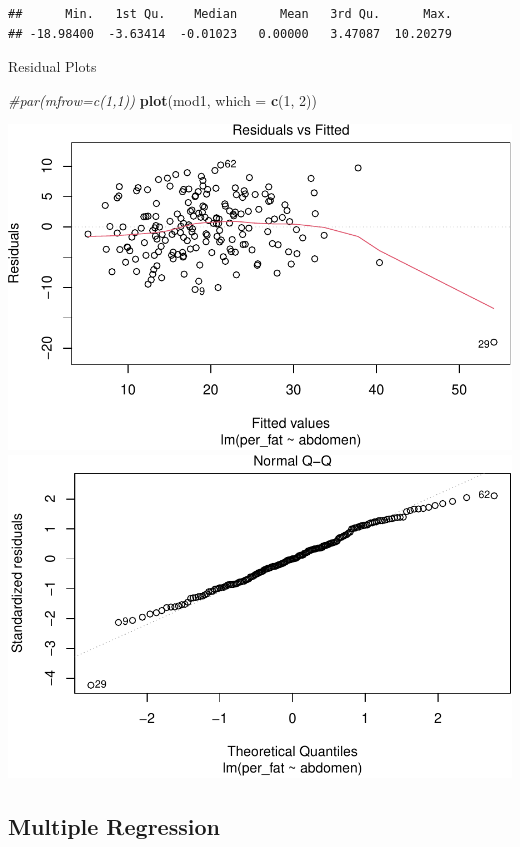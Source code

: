 \documentclass[]{article}
\newenvironment{Shaded}{\begin{snugshade}}{\end{snugshade}}
\newcommand{\KeywordTok}[1]{\textcolor[rgb]{0.13,0.29,0.53}{\textbf{#1}}}
\newcommand{\DataTypeTok}[1]{\textcolor[rgb]{0.13,0.29,0.53}{#1}}
\newcommand{\DecValTok}[1]{\textcolor[rgb]{0.00,0.00,0.81}{#1}}
\newcommand{\CommentTok}[1]{\textcolor[rgb]{0.56,0.35,0.01}{\textit{#1}}}
\newcommand{\NormalTok}[1]{#1}
\begin{document}
\begin{verbatim}
##      Min.   1st Qu.    Median      Mean   3rd Qu.      Max. 
## -18.98400  -3.63414  -0.01023   0.00000   3.47087  10.20279
\end{verbatim}

Residual Plots

\begin{Shaded}
\begin{Highlighting}[]
\CommentTok{#par(mfrow=c(1,1))}
\KeywordTok{plot}\NormalTok{(mod1, }\DataTypeTok{which =} \KeywordTok{c}\NormalTok{(}\DecValTok{1}\NormalTok{, }\DecValTok{2}\NormalTok{))}
\end{Highlighting}
\end{Shaded}

\includegraphics{BodyFat_files/figure-latex/unnamed-chunk-8-1.pdf}
\includegraphics{BodyFat_files/figure-latex/unnamed-chunk-8-2.pdf}

\subsection{Multiple Regression}\label{multiple-regression}
\end{document}
